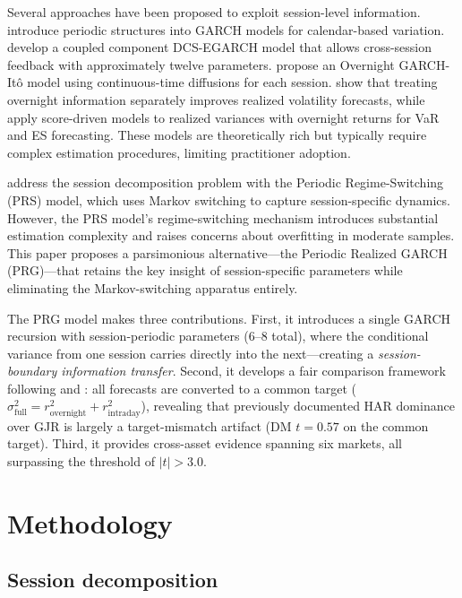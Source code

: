 \documentclass[11pt,a4paper]{article}
\begin{document}
Several approaches have been proposed to exploit session-level information. \citet{Bollerslev1996} introduce periodic structures into GARCH models for calendar-based variation. \citet{Linton2020} develop a coupled component DCS-EGARCH model that allows cross-session feedback with approximately twelve parameters. \citet{Kim2023} propose an Overnight GARCH-It\^{o} model using continuous-time diffusions for each session. \citet{Todorova2014} show that treating overnight information separately improves realized volatility forecasts, while \citet{Opschoor2021} apply score-driven models to realized variances with overnight returns for VaR and ES forecasting. These models are theoretically rich but typically require complex estimation procedures, limiting practitioner adoption.

\citet{Lai2024} address the session decomposition problem with the Periodic Regime-Switching (PRS) model, which uses Markov switching to capture session-specific dynamics. However, the PRS model's regime-switching mechanism introduces substantial estimation complexity and raises concerns about overfitting in moderate samples. This paper proposes a parsimonious alternative---the Periodic Realized GARCH (PRG)---that retains the key insight of session-specific parameters while eliminating the Markov-switching apparatus entirely.

The PRG model makes three contributions. First, it introduces a single GARCH recursion with session-periodic parameters (6--8 total), where the conditional variance from one session carries directly into the next---creating a \emph{session-boundary information transfer}. Second, it develops a fair comparison framework following \citet{Hansen2005} and \citet{Patton2011}: all forecasts are converted to a common target ($\sigma^2_{\text{full}} = r^2_{\text{overnight}} + r^2_{\text{intraday}}$), revealing that previously documented HAR dominance over GJR is largely a target-mismatch artifact (DM $t = 0.57$ on the common target). Third, it provides cross-asset evidence spanning six markets, all surpassing the \citet{Harvey2016} threshold of $|t| > 3.0$.


\section{Methodology}

\subsection{Session decomposition}
\end{document}
